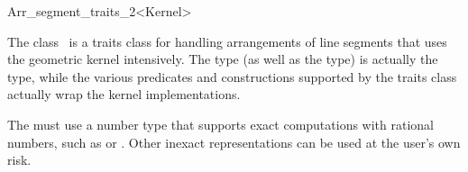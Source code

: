 
\ccRefPageBegin


\begin{ccRefClass}{Arr_segment_traits_2<Kernel>}

\ccDefinition
   The class \ccRefName\ is a traits class for handling arrangements of line
   segments that uses the geometric kernel intensively. 
   The  type (as well
   as the  type) is
   actually the  type, while the various predicates
   and constructions supported by the traits class actually wrap the
   kernel implementations.

   The  must use a number type that supports exact computations
   with rational numbers, such as  or . 
   Other inexact representations can be used at the user's own risk.


\ccIsModel
     


\end{ccRefClass} %

\ccRefPageEnd
